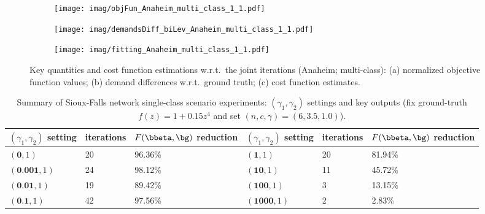 \documentclass[3p]{elsarticle}
\begin{document}
\begin{figure}[H]  
	\centering
	\begin{subfigure}[b]{0.8\textwidth}
		\texttt{[image: imag/objFun\_Anaheim\_multi\_class\_1\_1.pdf]}
		\caption{}
		\label{objFun_Anaheim}
	\end{subfigure} 
	\begin{subfigure}[b]{0.8\textwidth}
		\texttt{[image: imag/demandsDiff\_biLev\_Anaheim\_multi\_class\_1\_1.pdf]}
		\caption{}
		\label{demandsDiff_biLev_Anaheim}
	\end{subfigure}   
	\begin{subfigure}[b]{0.8\textwidth}
		\texttt{[image: imag/fitting\_Anaheim\_multi\_class\_1\_1.pdf]}
		\caption{}
		\label{fig:CostAnaheim}
	\end{subfigure}  
	\caption{Key quantities and cost function estimations w.r.t.\
          the joint iterations (Anaheim; multi-class): (a) normalized
          objective function values; (b) demand differences w.r.t.\
          ground truth; (c) cost function estimates.}
	\label{fig:Anaheim}
\end{figure}


\begin{table*}[hbt] 
	\centering
	\caption{Summary of Sioux-Falls network single-class scenario
          experiments:  $({\gamma_1},\gamma_2)$ settings and key outputs
          (fix ground-truth $f(z) = 1 + 0.15z^4$ and set $(n,c,\gamma) =
          (6,3.5,1.0)$).} \label{tab3} 
	\resizebox{\linewidth}{!}
	{\begin{tabular}{lll|lll}
            \toprule[1.2pt]
            \textbf{$({\gamma_1},\gamma_2)$ setting}  & \textbf{iterations} & \textbf{$F(\bbeta,\bg)$ reduction} &  \textbf{$({\gamma_1},\gamma_2)$ setting}  & \textbf{iterations} & \textbf{$F(\bbeta,\bg)$ reduction}  \\
            \midrule[1.2pt]
            $(\textbf{0},1)$  &  20  & 96.36\% &$(\textbf{1},1)$  &  20  & 81.94\% \\  
            \midrule[1.2pt]
            $(\textbf{0.001},1)$  &  24  & 98.12\% & $(\textbf{10},1)$  &  11  & 45.72\% \\ 
            \midrule[1.2pt]
            $(\textbf{0.01},1)$ &   19  & 89.42\% & $(\textbf{100},1)$  &  3  & 13.15\% \\ 
            \midrule[1.2pt]
            $(\textbf{0.1},1)$  &  42  & 97.56\%  & $(\textbf{1000},1)$ &  2  & 2.83\% \\ 
            \bottomrule[1.2pt]
		\end{tabular}}
	\end{table*}
		
\end{document}
